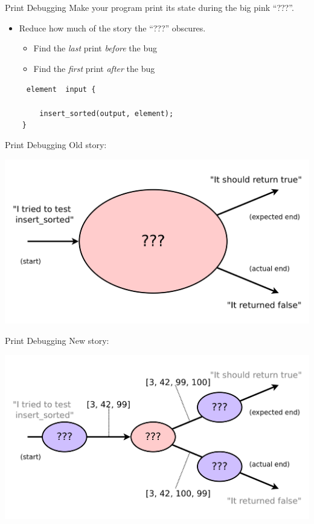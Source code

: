 \documentclass[xcolor=dvipsnames]{beamer}
\begin{document}
\begin{frame}{Print Debugging}
	Make your program print its state during the big pink ``???''.
	\begin{itemize}
		\item Reduce how much of the story the ``???'' obscures.
		\begin{itemize}
			\item Find the {\em last} print {\em before} the bug
			\item Find the {\em first} print {\em after} the bug
		\end{itemize}
	\end{itemize}
	\pause

	\linegap
		\texttt{~~~~~element~~input~\{} \\
		\texttt{~~~~~~~~} \\
		\texttt{~~~~~~~~insert\_sorted(output,~element);} \\
		\texttt{~~~~\}} \\

\end{frame}

\begin{frame}{Print Debugging}
	Old story:

	\includegraphics[width=\textwidth]{time0.png}
\end{frame}
\begin{frame}{Print Debugging}
	New story:

	\includegraphics[width=\textwidth]{time1.png}
\end{frame}
\end{document}
